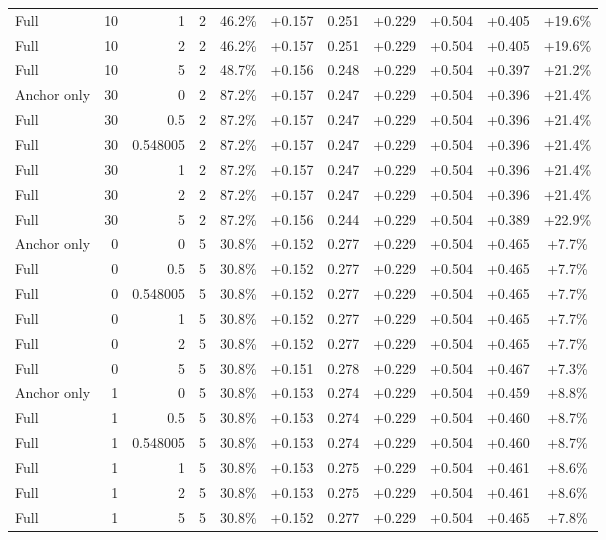 \begin{table}[htbp]
\begin{tabular}{lrrrccccccc}
Full & 10 & 1 & 2 & 46.2\% & +0.157 & 0.251 & +0.229 & +0.504 & +0.405 & +19.6\% \\
Full & 10 & 2 & 2 & 46.2\% & +0.157 & 0.251 & +0.229 & +0.504 & +0.405 & +19.6\% \\
Full & 10 & 5 & 2 & 48.7\% & +0.156 & 0.248 & +0.229 & +0.504 & +0.397 & +21.2\% \\
Anchor only & 30 & 0 & 2 & 87.2\% & +0.157 & 0.247 & +0.229 & +0.504 & +0.396 & +21.4\% \\
Full & 30 & 0.5 & 2 & 87.2\% & +0.157 & 0.247 & +0.229 & +0.504 & +0.396 & +21.4\% \\
Full & 30 & 0.548005 & 2 & 87.2\% & +0.157 & 0.247 & +0.229 & +0.504 & +0.396 & +21.4\% \\
Full & 30 & 1 & 2 & 87.2\% & +0.157 & 0.247 & +0.229 & +0.504 & +0.396 & +21.4\% \\
Full & 30 & 2 & 2 & 87.2\% & +0.157 & 0.247 & +0.229 & +0.504 & +0.396 & +21.4\% \\
Full & 30 & 5 & 2 & 87.2\% & +0.156 & 0.244 & +0.229 & +0.504 & +0.389 & +22.9\% \\
Anchor only & 0 & 0 & 5 & 30.8\% & +0.152 & 0.277 & +0.229 & +0.504 & +0.465 & +7.7\% \\
Full & 0 & 0.5 & 5 & 30.8\% & +0.152 & 0.277 & +0.229 & +0.504 & +0.465 & +7.7\% \\
Full & 0 & 0.548005 & 5 & 30.8\% & +0.152 & 0.277 & +0.229 & +0.504 & +0.465 & +7.7\% \\
Full & 0 & 1 & 5 & 30.8\% & +0.152 & 0.277 & +0.229 & +0.504 & +0.465 & +7.7\% \\
Full & 0 & 2 & 5 & 30.8\% & +0.152 & 0.277 & +0.229 & +0.504 & +0.465 & +7.7\% \\
Full & 0 & 5 & 5 & 30.8\% & +0.151 & 0.278 & +0.229 & +0.504 & +0.467 & +7.3\% \\
Anchor only & 1 & 0 & 5 & 30.8\% & +0.153 & 0.274 & +0.229 & +0.504 & +0.459 & +8.8\% \\
Full & 1 & 0.5 & 5 & 30.8\% & +0.153 & 0.274 & +0.229 & +0.504 & +0.460 & +8.7\% \\
Full & 1 & 0.548005 & 5 & 30.8\% & +0.153 & 0.274 & +0.229 & +0.504 & +0.460 & +8.7\% \\
Full & 1 & 1 & 5 & 30.8\% & +0.153 & 0.275 & +0.229 & +0.504 & +0.461 & +8.6\% \\
Full & 1 & 2 & 5 & 30.8\% & +0.153 & 0.275 & +0.229 & +0.504 & +0.461 & +8.6\% \\
Full & 1 & 5 & 5 & 30.8\% & +0.152 & 0.277 & +0.229 & +0.504 & +0.465 & +7.8\% \\

\end{tabular}
\end{table}

